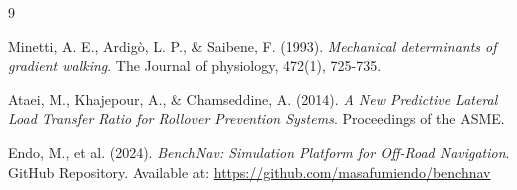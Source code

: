 \documentclass[12pt, a4paper]{article}
\begin{document}
\renewcommand{\refname}{Tài liệu tham khảo}
\begin{thebibliography}{9}

Minetti, A. E., Ardigò, L. P., \& Saibene, F. (1993). 
\textit{Mechanical determinants of gradient walking}. 
The Journal of physiology, 472(1), 725-735.

Ataei, M., Khajepour, A., \& Chamseddine, A. (2014). 
\textit{A New Predictive Lateral Load Transfer Ratio for Rollover Prevention Systems}. 
Proceedings of the ASME.

Endo, M., et al. (2024). 
\textit{BenchNav: Simulation Platform for Off-Road Navigation}. 
GitHub Repository. Available at: \url{https://github.com/masafumiendo/benchnav}

\end{thebibliography}
\end{document}
